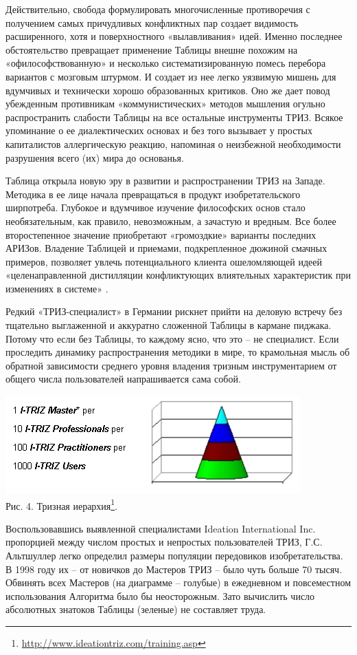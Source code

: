 \documentclass[11pt,a4paper]{article}
\begin{document}
Действительно, свобода формулировать многочисленные противоречия с получением
самых причудливых конфликтных пар создает видимость расширенного, хотя и
поверхностного «вылавливания» идей. Именно последнее обстоятельство превращает
применение Таблицы внешне похожим на «офилософствованную» и несколько
систематизированную помесь перебора вариантов с мозговым штурмом. И создает из
нее легко уязвимую мишень для вдумчивых и технически хорошо образованных
критиков. Оно же дает повод убежденным противникам «коммунистических» методов
мышления огульно распространить слабости Таблицы на все остальные инструменты
ТРИЗ. Всякое упоминание о ее диалектических основах и без того вызывает у
простых капиталистов аллергическую реакцию, напоминая о неизбежной
необходимости разрушения всего (их) мира до основанья.

Таблица открыла новую эру в развитии и распространении ТРИЗ на Западе.
Методика в ее лице начала превращаться в продукт изобретательского ширпотреба.
Глубокое и вдумчивое изучение философских основ стало необязательным, как
правило, невозможным, а зачастую и вредным. Все более второстепенное значение
приобретают «громоздкие» варианты последних АРИЗов. Владение Таблицей и
приемами, подкрепленное дюжиной смачных примеров, позволяет увлечь
потенциального клиента ошеломляющей идеей «целенаправленной дистилляции
конфликтующих влиятельных характеристик при изменениях в системе»
\cite{Sietmann2001}. 

Редкий «ТРИЗ-специалист» в Германии рискнет прийти на деловую встречу без
тщательно выглаженной и аккуратно сложенной Таблицы в кармане пиджака. Потому
что если без Таблицы, то каждому ясно, что это -- не специалист. Если
проследить динамику распространения методики в мире, то крамольная мысль об
обратной зависимости среднего уровня владения тризным инструментарием от
общего числа пользователей напрашивается сама собой.

\begin{center}
  \includegraphics[width=.5\textwidth]{./6.jpg} \\
  Рис. 4. Тризная
  иерархия\footnote{\url{http://www.ideationtriz.com/training.asp}}. 
\end{center}

Воспользовавшись выявленной специалистами Ideation International Inc.
пропорцией между числом простых и непростых пользователей ТРИЗ,
Г.С. Альтшуллер легко определил размеры популяции передовиков
изобретательства. В 1998 году их -- от новичков до Мастеров ТРИЗ -- было чуть
больше 70 тысяч. Обвинять всех Мастеров (на диаграмме -- голубые) в ежедневном
и повсеместном использования Алгоритма было бы неосторожным. Зато вычислить
число абсолютных знатоков Таблицы (зеленые) не составляет труда.
\end{document}
